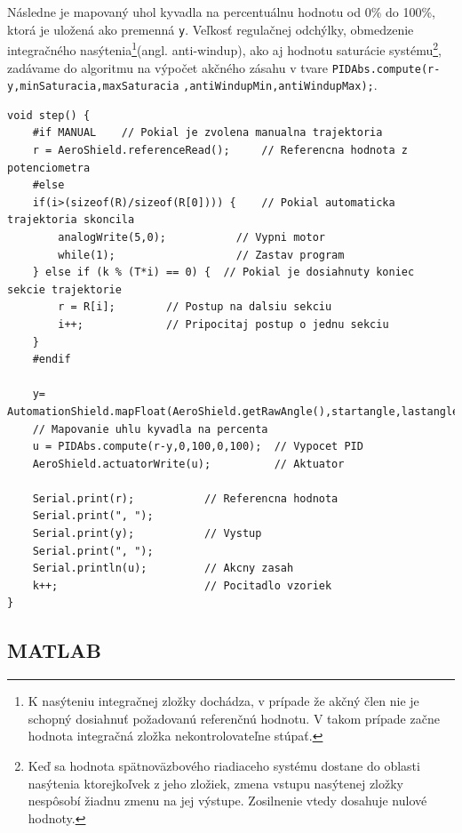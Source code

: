 Následne je mapovaný uhol kyvadla na percentuálnu hodnotu od 0\% do 100\%, ktorá je uložená ako premenná \verb|y|. Veľkosť regulačnej odchýlky, obmedzenie integračného nasýtenia\footnote[9]{K nasýteniu integračnej zložky dochádza, v prípade že akčný člen nie je schopný dosiahnuť požadovanú referenčnú
	hodnotu. V takom prípade začne hodnota integračná zložka nekontrolovateľne stúpať.}(angl. anti-windup), ako aj hodnotu saturácie systému\footnote[10]{Keď sa hodnota spätnoväzbového riadiaceho systému dostane do oblasti nasýtenia ktorejkoľvek z jeho zložiek, zmena vstupu nasýtenej zložky nespôsobí žiadnu zmenu na jej výstupe. Zosilnenie vtedy dosahuje nulové hodnoty.}, zadávame do algoritmu na výpočet akčného zásahu v tvare \verb|PIDAbs.compute(r-y,minSaturacia,maxSaturacia|
\verb|,antiWindupMin,antiWindupMax);|. 


\begin{lstlisting}[caption={Funkcia step().},captionpos=b]
void step() {            
	#if MANUAL    // Pokial je zvolena manualna trajektoria 
	r = AeroShield.referenceRead();     // Referencna hodnota z potenciometra
	#else         
	if(i>(sizeof(R)/sizeof(R[0]))) {    // Pokial automaticka trajektoria skoncila
		analogWrite(5,0);           // Vypni motor
		while(1);                   // Zastav program
	} else if (k % (T*i) == 0) {  // Pokial je dosiahnuty koniec       sekcie trajektorie
		r = R[i];        // Postup na dalsiu sekciu
		i++;             // Pripocitaj postup o jednu sekciu 
	}
	#endif
	
    y= AutomationShield.mapFloat(AeroShield.getRawAngle(),startangle,lastangle,0.00,100.00);
	// Mapovanie uhlu kyvadla na percenta 
	u = PIDAbs.compute(r-y,0,100,0,100);  // Vypocet PID 
	AeroShield.actuatorWrite(u);          // Aktuator
	
	Serial.print(r);           // Referencna hodnota 
	Serial.print(", ");
	Serial.print(y);           // Vystup 
	Serial.print(", ");
	Serial.println(u);         // Akcny zasah 
	k++;                       // Pocitadlo vzoriek 
}
\end{lstlisting}



\subsection{MATLAB}






